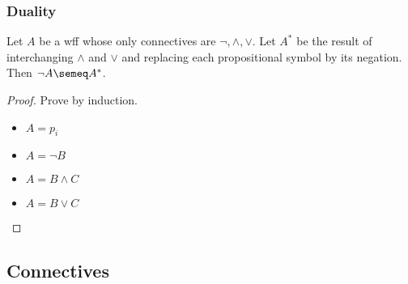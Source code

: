 \documentclass[UTF8,aspectratio=43,11pt,colorlinks,compress,openany]{beamer}%
\begin{document}
\begin{frame}\frametitle{Duality}
	\begin{theorem}
		Let $A$ be a wff whose only connectives are $\neg,\wedge,\vee$. Let $A^*$ be the result of interchanging $\wedge$ and $\vee$ and replacing each propositional symbol by its negation. Then $\neg A\semeq A^*$.
	\end{theorem}
	\begin{proof}
		Prove by induction.
		\begin{itemize}
			\item $A=p_i$
			\item $A=\neg B$
			\item $A=B\wedge C$
			\item $A=B\vee C$
		\end{itemize}
	\end{proof}
\end{frame}

\subsection{Connectives}
\end{document}

